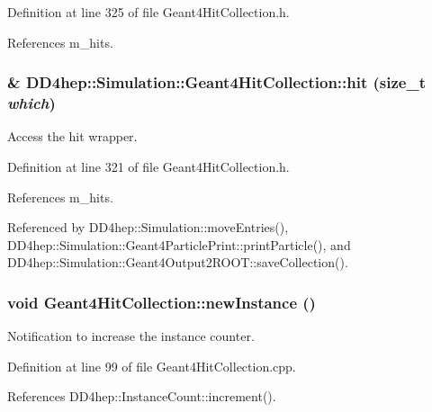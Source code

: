 Definition at line 325 of file Geant4HitCollection.h.

References m\_\-hits.\hypertarget{class_d_d4hep_1_1_simulation_1_1_geant4_hit_collection_a6d42d1abdf6f052cc6606f0c55d55388}{
\subsubsection[{hit}]{\& DD4hep::Simulation::Geant4HitCollection::hit (size\_\-t {\em which})}}
\label{class_d_d4hep_1_1_simulation_1_1_geant4_hit_collection_a6d42d1abdf6f052cc6606f0c55d55388}


Access the hit wrapper. 

Definition at line 321 of file Geant4HitCollection.h.

References m\_\-hits.

Referenced by DD4hep::Simulation::moveEntries(), DD4hep::Simulation::Geant4ParticlePrint::printParticle(), and DD4hep::Simulation::Geant4Output2ROOT::saveCollection().\hypertarget{class_d_d4hep_1_1_simulation_1_1_geant4_hit_collection_abd59378fa4d12c151299841d340fd63e}{
\subsubsection[{newInstance}]{\setlength{\rightskip}{0pt plus 5cm}void Geant4HitCollection::newInstance ()}}
\label{class_d_d4hep_1_1_simulation_1_1_geant4_hit_collection_abd59378fa4d12c151299841d340fd63e}


Notification to increase the instance counter. 

Definition at line 99 of file Geant4HitCollection.cpp.

References DD4hep::InstanceCount::increment().

